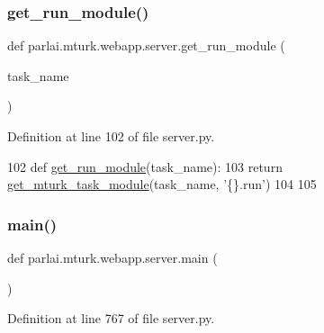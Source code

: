 \subsubsection{\texorpdfstring{get\+\_\+run\+\_\+module()}{get\_run\_module()}}
{\footnotesize\ttfamily def parlai.\+mturk.\+webapp.\+server.\+get\+\_\+run\+\_\+module (\begin{DoxyParamCaption}\item[{}]{task\+\_\+name }\end{DoxyParamCaption})}



Definition at line 102 of file server.\+py.


\begin{DoxyCode}
102 \textcolor{keyword}{def }\hyperlink{namespaceparlai_1_1mturk_1_1webapp_1_1server_a49eb9835228f9f47f9aa55bc6369c23f}{get\_run\_module}(task\_name):
103     \textcolor{keywordflow}{return} \hyperlink{namespaceparlai_1_1mturk_1_1webapp_1_1server_a0c7e088cb9401f94297c2ae96dce3ec2}{get\_mturk\_task\_module}(task\_name, \textcolor{stringliteral}{'\{\}.run'})
104 
105 
\end{DoxyCode}
\mbox{\label{namespaceparlai_1_1mturk_1_1webapp_1_1server_a1919be0d74781c0b9f579daf974d9f53}} 
\subsubsection{\texorpdfstring{main()}{main()}}
{\footnotesize\ttfamily def parlai.\+mturk.\+webapp.\+server.\+main (\begin{DoxyParamCaption}{ }\end{DoxyParamCaption})}



Definition at line 767 of file server.\+py.


